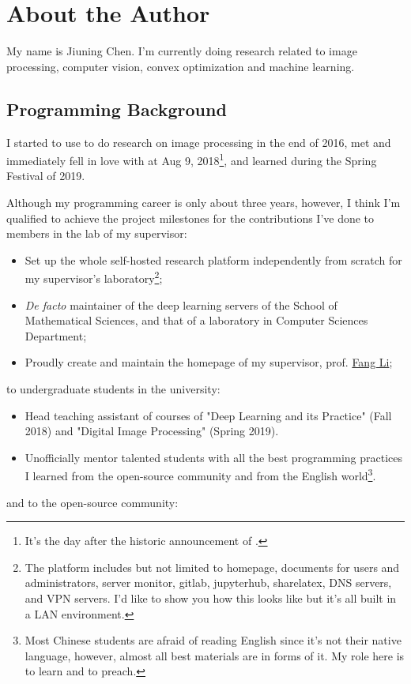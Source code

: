 
\section{About the Author}\label{sec:about_author}

My name is \textsf{Jiuning Chen}. I'm currently doing research related to image processing, computer vision, convex optimization and machine learning.\par

\subsection{Programming Background}

I started to use \langmatlab to do research on image processing in the end of 2016, met and immediately fell in love with \langjulia at Aug 9, 2018\footnote{It's the day after the historic announcement of \langjulia {}.}, and learned \langpython during the Spring Festival of 2019. \par

Although my programming career is only about three years, however, I think I'm qualified to achieve the project milestones for the contributions I've done to members in the lab of my supervisor:

\begin{itemize}
    \item Set up the whole self-hosted research platform independently from scratch for my supervisor's laboratory\footnote{The platform includes but not limited to homepage, documents for users and administrators, server monitor, gitlab, jupyterhub, sharelatex, DNS servers, and VPN servers. I'd like to show you how this looks like but it's all built in a LAN environment.};
    \item \textit{De facto} maintainer of the deep learning servers of the School of Mathematical Sciences, and that of a laboratory in Computer Sciences Department;
    \item Proudly create and maintain the homepage of my supervisor, prof. \href{http://math.ecnu.edu.cn/~fli/}{\textsf{Fang Li}};
\end{itemize}
to undergraduate students in the university:
\begin{itemize}
    \item Head teaching assistant of courses of "Deep Learning and its Practice" (Fall 2018) and "Digital Image Processing" (Spring 2019).
    \item Unofficially mentor talented students with all the best programming practices I learned from the open-source community and from the English world\footnote{Most Chinese students are afraid of reading English since it's not their native language, however, almost all best materials are in forms of it. My role here is to learn and to preach.}.
\end{itemize}
and to the open-source community:

